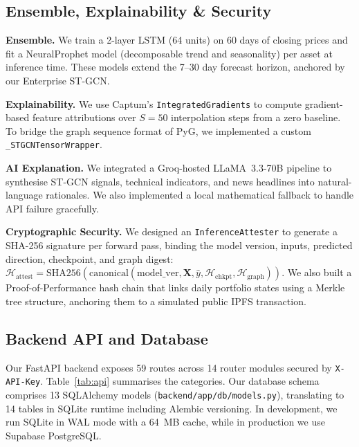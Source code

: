 \documentclass{article}
\begin{document}
\subsection{Ensemble, Explainability \& Security}

\textbf{Ensemble.} We train a 2-layer LSTM (64 units) on 60 days of closing prices and fit a NeuralProphet model \cite{taylor2018prophet} (decomposable trend and seasonality) per asset at inference time. These models extend the 7--30 day forecast horizon, anchored by our Enterprise ST-GCN.

\textbf{Explainability.} We use Captum's \texttt{IntegratedGradients} \cite{sundararajan2017ig} to compute gradient-based feature attributions over $S=50$ interpolation steps from a zero baseline. To bridge the graph sequence format of PyG, we implemented a custom \texttt{\_STGCNTensorWrapper}.

\textbf{AI Explanation.} We integrated a Groq-hosted LLaMA~3.3-70B pipeline to synthesise ST-GCN signals, technical indicators, and news headlines into natural-language rationales. We also implemented a local mathematical fallback to handle API failure gracefully.

\textbf{Cryptographic Security.} We designed an \texttt{InferenceAttester} to generate a SHA-256 signature per forward pass, binding the model version, inputs, predicted direction, checkpoint, and graph digest:
$\mathcal{H}_{\mathrm{attest}} = \mathrm{SHA256}(\mathrm{canonical}(\mathrm{model\_ver}, \mathbf{X}, \hat{y}, \mathcal{H}_{\mathrm{chkpt}}, \mathcal{H}_{\mathrm{graph}}))$.
We also built a Proof-of-Performance hash chain that links daily portfolio states using a Merkle tree structure, anchoring them to a simulated public IPFS transaction.

\subsection{Backend API and Database}

Our FastAPI backend exposes 59 routes across 14 router modules secured by \texttt{X-API-Key}. Table~\ref{tab:api} summarises the categories. Our database schema comprises 13 SQLAlchemy models (\texttt{backend/app/db/models.py}), translating to 14 tables in SQLite runtime including Alembic versioning. In development, we run SQLite in WAL mode with a 64~MB cache, while in production we use Supabase PostgreSQL.
\end{document}
